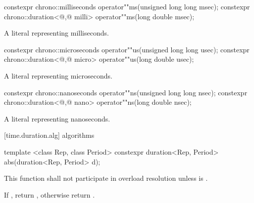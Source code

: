 %
\begin{itemdecl}
constexpr chrono::milliseconds                 operator""ms(unsigned long long msec);
constexpr chrono::duration<@\unspec,@ milli> operator""ms(long double msec);
\end{itemdecl}

\begin{itemdescr}
\pnum
\returns
A  literal representing  milliseconds.
\end{itemdescr}

%
\begin{itemdecl}
constexpr chrono::microseconds                 operator""us(unsigned long long usec);
constexpr chrono::duration<@\unspec,@ micro> operator""us(long double usec);
\end{itemdecl}

\begin{itemdescr}
\pnum
\returns
A  literal representing  microseconds.
\end{itemdescr}

%
\begin{itemdecl}
constexpr chrono::nanoseconds                 operator""ns(unsigned long long nsec);
constexpr chrono::duration<@\unspec,@ nano> operator""ns(long double nsec);
\end{itemdecl}

\begin{itemdescr}
\pnum
\returns
A  literal representing  nanoseconds.
\end{itemdescr}

[time.duration.alg]{ algorithms}

%
\begin{itemdecl}
template <class Rep, class Period>
  constexpr duration<Rep, Period> abs(duration<Rep, Period> d);
\end{itemdecl}

\begin{itemdescr}
\pnum
\remarks This function shall not participate in overload resolution
unless  is .

\pnum
\returns If , return ,
otherwise return .
\end{itemdescr}

